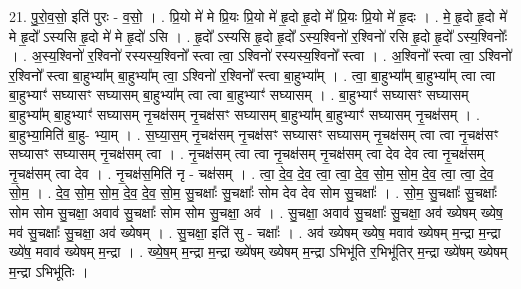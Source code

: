 \documentclass[17pt]{extarticle}
\begin{document}
21. पु॒रो॒व॒सो॒ इति॑ पुरः - व॒सो॒ । . प्रि॒यो मे॑ मे प्रि॒यः प्रि॒यो मे॑ हृ॒दो हृ॒दो मे᳚ प्रि॒यः प्रि॒यो मे॑ हृ॒दः । . मे॒ हृ॒दो हृ॒दो मे॑ मे हृ॒दो᳚ ऽस्यसि हृ॒दो मे॑ मे हृ॒दो॑ ऽसि । . हृ॒दो᳚ ऽस्यसि हृ॒दो हृ॒दो᳚ ऽस्य॒श्विनो॑ र॒श्विनो॑ रसि हृ॒दो हृ॒दो᳚ ऽस्य॒श्विनोः᳚ । . अ॒स्य॒श्विनो॑ र॒श्विनो॑ रस्यस्य॒श्विनो᳚ स्त्वा त्वा॒ ऽश्विनो॑ रस्यस्य॒श्विनो᳚ स्त्वा । . अ॒श्विनो᳚ स्त्वा त्वा॒ ऽश्विनो॑ र॒श्विनो᳚ स्त्वा बा॒हुभ्या᳚म् बा॒हुभ्या᳚म् त्वा॒ ऽश्विनो॑ र॒श्विनो᳚ स्त्वा बा॒हुभ्या᳚म् । . त्वा॒ बा॒हुभ्या᳚म् बा॒हुभ्या᳚म् त्वा त्वा बा॒हुभ्याꣳ॑ सघ्यासꣳ सघ्यासम् बा॒हुभ्या᳚म् त्वा त्वा बा॒हुभ्याꣳ॑ सघ्यासम् । . बा॒हुभ्याꣳ॑ सघ्यासꣳ सघ्यासम् बा॒हुभ्या᳚म् बा॒हुभ्याꣳ॑ सघ्यासम् नृ॒चक्ष॑सम् नृ॒चक्ष॑सꣳ सघ्यासम् बा॒हुभ्या᳚म् बा॒हुभ्याꣳ॑ सघ्यासम् नृ॒चक्ष॑सम् । . बा॒हुभ्या॒मिति॑ बा॒हु- भ्या॒म् । . स॒घ्या॒स॒म् नृ॒चक्ष॑सम् नृ॒चक्ष॑सꣳ सघ्यासꣳ सघ्यासम् नृ॒चक्ष॑सम् त्वा त्वा नृ॒चक्ष॑सꣳ सघ्यासꣳ सघ्यासम् नृ॒चक्ष॑सम् त्वा । . नृ॒चक्ष॑सम् त्वा त्वा नृ॒चक्ष॑सम् नृ॒चक्ष॑सम् त्वा देव देव त्वा नृ॒चक्ष॑सम् नृ॒चक्ष॑सम् त्वा देव । . नृ॒चक्ष॑स॒मिति॑ नृ - चक्ष॑सम् । . त्वा॒ दे॒व॒ दे॒व॒ त्वा॒ त्वा॒ दे॒व॒ सो॒म॒ सो॒म॒ दे॒व॒ त्वा॒ त्वा॒ दे॒व॒ सो॒म॒ । . दे॒व॒ सो॒म॒ सो॒म॒ दे॒व॒ दे॒व॒ सो॒म॒ सु॒चक्षाः᳚ सु॒चक्षाः᳚ सोम देव देव सोम सु॒चक्षाः᳚ । . सो॒म॒ सु॒चक्षाः᳚ सु॒चक्षाः᳚ सोम सोम सु॒चक्षा॒ अवाव॑ सु॒चक्षाः᳚ सोम सोम सु॒चक्षा॒ अव॑ । . सु॒चक्षा॒ अवाव॑ सु॒चक्षाः᳚ सु॒चक्षा॒ अव॑ ख्येषम् ख्येष॒ मव॑ सु॒चक्षाः᳚ सु॒चक्षा॒ अव॑ ख्येषम् । . सु॒चक्षा॒ इति॑ सु - चक्षाः᳚ । . अव॑ ख्येषम् ख्येष॒ मवाव॑ ख्येषम् म॒न्द्रा म॒न्द्रा ख्ये॑ष॒ मवाव॑ ख्येषम् म॒न्द्रा । . ख्ये॒ष॒म् म॒न्द्रा म॒न्द्रा ख्ये॑षम् ख्येषम् म॒न्द्रा ऽभिभू॑ति र॒भिभू॑तिर् म॒न्द्रा ख्ये॑षम् ख्येषम् म॒न्द्रा ऽभिभू॑तिः । \newline
\end{document}

